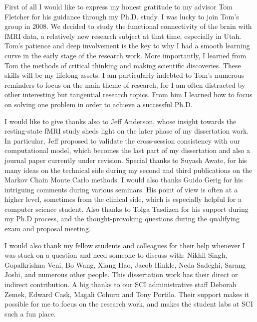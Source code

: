 First of all I would like to express my honest gratitude to my advisor Tom
Fletcher for his guidance through my Ph.D. study. I was lucky to join Tom's group
in 2008. We decided to study the functional connectivity of the brain with fMRI
data, a relatively new research subject at that time, especially in Utah.  Tom's
patience and deep involvement is the key to why I had a smooth learning curve in
the early stage of the research work. More importantly, I learned from Tom the
methods of critical thinking and making scientific discoveries. These skills will
be my lifelong assets. I am particularly indebted to Tom's numerous reminders to
focus on the main theme of research, for I am often distracted by other
interesting but tangential research topics. From him I learned how to focus on
solving one problem in order to achieve a successful Ph.D.

I would like to give thanks also to Jeff Anderson, whose insight towards the
resting-state fMRI study sheds light on the later phase of my dissertation work. In
particular, Jeff proposed to validate the cross-session consistency with our
computational model, which becomes the last part of my dissertation and also a journal
paper currently under revision. Special thanks to Suyash Awate, for his many
ideas on the technical side during my second and third publications on the
Markov Chain Monte Carlo methods. I would also thanks Guido Gerig for his
intriguing comments during various seminars. His point of view is often at a
higher level, sometimes from the clinical side, which is especially helpful for a
computer science student. Also thanks to Tolga Tasdizen for his support during
my Ph.D process, and the thought-provoking questions during the qualifying exam and
proposal meeting.

I would also thank my fellow students and colleagues for their help whenever I
was stuck on a question and need someone to discuss with: Nikhil Singh,
Gopalkrishna Veni, Bo Wang, Xiang Hao, Jacob Hinkle, Neda Sadeghi, Sarang Joshi,
and numerous other people. This dissertation work has their direct or indirect
contribution. A big thanks to our SCI administrative staff Deborah Zemek, Edward
Cask, Magali Cohurn and Tony Portilo. Their support makes it possible for me to
focus on the research work, and makes the student labs at SCI such a fun place.
